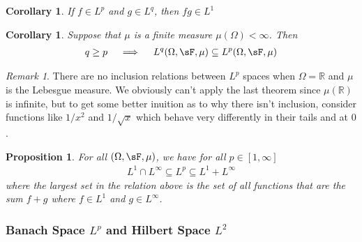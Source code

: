 \documentclass[12pt]{article}
\theoremstyle{plain}
\newtheorem{prop}[thm]{Proposition}
\newtheorem{cor}[thm]{Corollary}
\theoremstyle{definition}
\theoremstyle{remark}
\newtheorem*{rmk}{Remark}
\begin{document}
\begin{cor}
    If $f\in L^p$ and $g\in L^{q}$, then $fg\in L^1$

\end{cor}


\begin{cor}
Suppose that $\mu$ is a finite measure $\mu(\Omega)<\infty$.
Then
\begin{align*}
  q \geq p
  \quad\implies\quad
  L^q(\Omega,\sF,\mu)
  \subseteq
  L^p(\Omega,\sF,\mu)
\end{align*}
\end{cor}
\begin{rmk}
There are no inclusion relations between $L^p$ spaces when
$\Omega=\mathbb{R}$ and $\mu$ is the Lebesgue measure. We obviously
can't apply the last theorem since $\mu(\mathbb{R})$ is infinite, but to
get some better inuition as to why there isn't inclusion, consider
functions like $1/x^2$ and $1/\sqrt{x}$ which behave very differently in
their tails and at $0$.
\end{rmk}

\begin{prop}
For all $(\Omega,\sF,\mu)$, we have for all $p\in[1,\infty]$
\begin{align*}
  L^1 \cap L^\infty \subseteq L^p \subseteq L^1+L^\infty
\end{align*}
where the largest set in the relation above is the set of all functions
that are the sum $f+g$ where $f\in L^1$ and $g\in L^\infty$.
\end{prop}


\clearpage
\subsubsection{Banach Space $L^p$ and Hilbert Space $L^2$}
\end{document}
